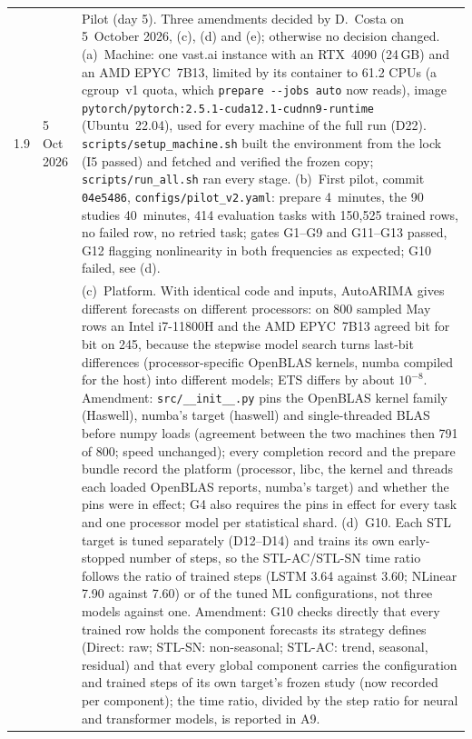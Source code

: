 \documentclass[11pt,a4paper]{article}
\newcommand{\code}[1]{\texttt{#1}}
\begin{document}
\begin{longtable}{@{}p{1.3cm} p{1.9cm} p{11.8cm}@{}}
1.9 & 5 Oct 2026 & Pilot (day 5). Three amendments decided by D.\ Costa on 5~October 2026, (c), (d) and (e); otherwise no decision changed. (a)~Machine: one vast.ai instance with an RTX~4090 (24\,GB) and an AMD EPYC~7B13, limited by its container to 61.2 CPUs (a cgroup~v1 quota, which \code{prepare -{}-jobs auto} now reads), image \mbox{\code{pytorch/pytorch:2.5.1-cuda12.1-cudnn9-runtime}} (Ubuntu~22.04), used for every machine of the full run (D22). \mbox{\code{scripts/setup_machine.sh}} built the environment from the lock (I5 passed) and fetched and verified the frozen copy; \mbox{\code{scripts/run_all.sh}} ran every stage. (b)~First pilot, commit \code{04e5486}, \mbox{\code{configs/pilot_v2.yaml}}: prepare 4~minutes, the 90 studies 40~minutes, 414 evaluation tasks with 150,525 trained rows, no failed row, no retried task; gates G1--G9 and G11--G13 passed, G12 flagging nonlinearity in both frequencies as expected; G10 failed, see (d). \\
 & & (c)~Platform. With identical code and inputs, AutoARIMA gives different forecasts on different processors: on 800 sampled May rows an Intel i7-11800H and the AMD EPYC~7B13 agreed bit for bit on 245, because the stepwise model search turns last-bit differences (processor-specific OpenBLAS kernels, numba compiled for the host) into different models; ETS differs by about $10^{-8}$. Amendment: \mbox{\code{src/__init__.py}} pins the OpenBLAS kernel family (Haswell), numba's target (haswell) and single-threaded BLAS before numpy loads (agreement between the two machines then 791 of 800; speed unchanged); every completion record and the prepare bundle record the platform (processor, libc, the kernel and threads each loaded OpenBLAS reports, numba's target) and whether the pins were in effect; G4 also requires the pins in effect for every task and one processor model per statistical shard. (d)~G10. Each STL target is tuned separately (D12--D14) and trains its own early-stopped number of steps, so the STL-AC/STL-SN time ratio follows the ratio of trained steps (LSTM 3.64 against 3.60; NLinear 7.90 against 7.60) or of the tuned ML configurations, not three models against one. Amendment: G10 checks directly that every trained row holds the component forecasts its strategy defines (Direct: raw; STL-SN: non-seasonal; STL-AC: trend, seasonal, residual) and that every global component carries the configuration and trained steps of its own target's frozen study (now recorded per component); the time ratio, divided by the step ratio for neural and transformer models, is reported in A9. \\

\end{longtable}
\end{document}

